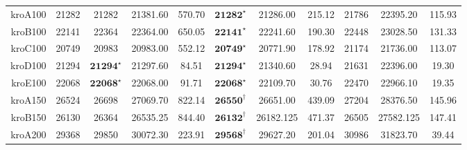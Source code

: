 \documentclass[12pt]{ctexart}
\begin{document}
\begin{table}[htbp]
\begin{tabular}{rcccccccccc}
        kroA100                       & 21282                             & 21282                       & 21381.60                               & 570.70           & $\textbf{21282}^\star$  & 21286.00         & 215.12           & 21786                 & 22395.20         & 115.93           \\
        kroB100                       & 22141                             & 22364                       & 22364.00                               & 650.05           & $\textbf{22141}^\star$  & 22241.60         & 190.30           & 22448                 & 23028.50         & 131.33           \\
        kroC100                       & 20749                             & 20983                       & 20983.00                               & 552.12           & $\textbf{20749}^\star$  & 20771.90         & 178.92           & 21174                 & 21736.00         & 113.07           \\
        kroD100                       & 21294                             & $\textbf{21294}^\star$      & 21297.60                               & 84.51            & $\textbf{21294}^\star$  & 21340.60         & 28.94            & 21631                 & 22396.00         & 19.30            \\
        kroE100                       & 22068                             & $\textbf{22068}^\star$      & 22068.00                               & 91.71            & $\textbf{22068}^\star$  & 22109.70         & 30.76            & 22470                 & 22966.10         & 19.35            \\
        kroA150                       & 26524                             & 26698                       & 27069.70                               & 822.14           & $\textbf{26550}^\dag$   & 26651.00         & 439.09           & 27204                 & 28376.50         & 145.96           \\
        kroB150                       & 26130                             & 26364                       & 26535.25                               & 844.40           & $\textbf{26132}^\dag$   & 26182.125        & 471.37           & 26505                 & 27582.125        & 147.41           \\
        kroA200                       & 29368                             & 29850                       & 30072.30                               & 223.91           & $\textbf{29568}^\dag$   & 29627.20         & 201.04           & 30986                 & 31823.70         & 39.44            \\

\end{tabular}
\end{table}
\end{document}
